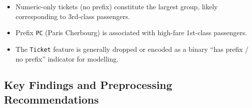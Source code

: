 \documentclass[twoside]{hcmut-report}
\begin{document}
\begin{itemize}
    \item Numeric-only tickets (no prefix) constitute the largest group, likely corresponding to 3rd-class passengers.
    \item Prefix \texttt{PC} (Paris Cherbourg) is associated with high-fare 1st-class passengers.
    \item The \texttt{Ticket} feature is generally dropped or encoded as a binary ``has prefix / no prefix'' indicator for modelling.
\end{itemize}

\subsection{Key Findings and Preprocessing Recommendations}
\end{document}
